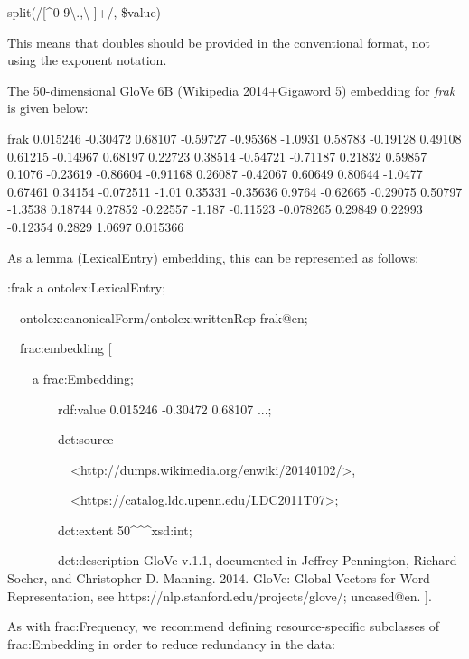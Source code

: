 \documentclass[a4paper]{article}
\newcommand\textstyleInternetlink[1]{\textcolor[rgb]{0.0,0.0,0.5019608}{#1}}
\newcommand\textstyleSourceText[1]{\textrm{#1}}
\newcommand\textstyleTeletype[1]{\textrm{#1}}
\begin{document}
\textstyleSourceText{split(/[\^{}0-9{\textbackslash}.,{\textbackslash}-]+/, \$value)}

This means that doubles should be provided in the conventional format, not using the exponent notation. 

The 50-dimensional \href{https://nlp.stanford.edu/projects/glove/}{\textstyleInternetlink{GloVe}} 6B (Wikipedia 2014+Gigaword 5) embedding for \textit{frak} is given below: 

\textstyleTeletype{frak 0.015246 -0.30472 0.68107 -0.59727 -0.95368 -1.0931 0.58783 -0.19128 0.49108 0.61215 -0.14967 0.68197 0.22723 0.38514 -0.54721 -0.71187 0.21832 0.59857 0.1076 -0.23619 -0.86604 -0.91168 0.26087 -0.42067 0.60649 0.80644 -1.0477 0.67461 0.34154 -0.072511 -1.01 0.35331 -0.35636 0.9764 -0.62665 -0.29075 0.50797 -1.3538 0.18744 0.27852 -0.22557 -1.187 -0.11523 -0.078265 0.29849 0.22993 -0.12354 0.2829 1.0697 0.015366}

As a lemma (LexicalEntry) embedding, this can be represented as follows: 


\bigskip

\textstyleSourceText{:frak a ontolex:LexicalEntry;}

\textstyleSourceText{\ \ ontolex:canonicalForm/ontolex:writtenRep {\textquotedbl}frak{\textquotedbl}@en;}

\textstyleSourceText{\ \ frac:embedding [ }

\textstyleSourceText{\ \ \ \ a frac:Embedding;}

\textstyleSourceText{\ \ \ \ \ \ \ \ rdf:value {\textquotedbl}0.015246 -0.30472 0.68107 ...{\textquotedbl};}

\textstyleSourceText{\ \ \ \ \ \ \ \ dct:source }

\textstyleSourceText{\ \ \ \ \ \ \ \ \ \ {\textless}http://dumps.wikimedia.org/enwiki/20140102/{\textgreater},}

\textstyleSourceText{\ \ \ \ \ \ \ \ \ \ {\textless}https://catalog.ldc.upenn.edu/LDC2011T07{\textgreater};}

\textstyleSourceText{\ \ \ \ \ \ \ \ dct:extent 50\^{}\^{}\^{}xsd:int;}

\textstyleSourceText{\ \ \ \ \ \ \ \ dct:description {\textquotedbl}GloVe v.1.1, documented in Jeffrey Pennington, Richard Socher, and Christopher D. Manning. 2014. GloVe: Global Vectors for Word Representation, see https://nlp.stanford.edu/projects/glove/; uncased{\textquotedbl}@en. ].}


\bigskip

As with \textstyleTeletype{frac:Frequency}, we recommend defining resource-specific subclasses of \textstyleTeletype{frac:Embedding} in order to reduce redundancy in the data:
\end{document}
